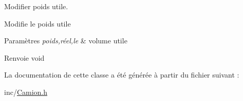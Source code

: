 Modifier poids utile. 

Modifie le poids utile


\begin{DoxyParams}{Paramètres}
{\em poids,réel,le} & volume utile \\
\hline
\end{DoxyParams}
\begin{DoxyReturn}{Renvoie}
void 
\end{DoxyReturn}


La documentation de cette classe a été générée à partir du fichier suivant :\begin{DoxyCompactItemize}
\item 
inc/\hyperlink{_camion_8h}{Camion.h}\end{DoxyCompactItemize}
